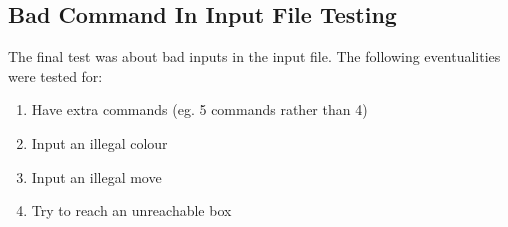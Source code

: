 \documentclass[12pt, A4]{report}
\begin{document}
			\begin{figure}[h]
				\centering	
				\qquad
			\end{figure}

		\subsection*{Bad Command In Input File Testing}
		The final test was about bad inputs in the input file. The following eventualities were tested for:
			\begin{enumerate}
				\item Have extra commands (eg. 5 commands rather than 4)
				\item Input an illegal colour
				\item Input an illegal move
				\item Try to reach an unreachable box
			\end{enumerate}

			\begin{figure}[h]
				\centering	
				\qquad
			\end{figure}
\end{document}
